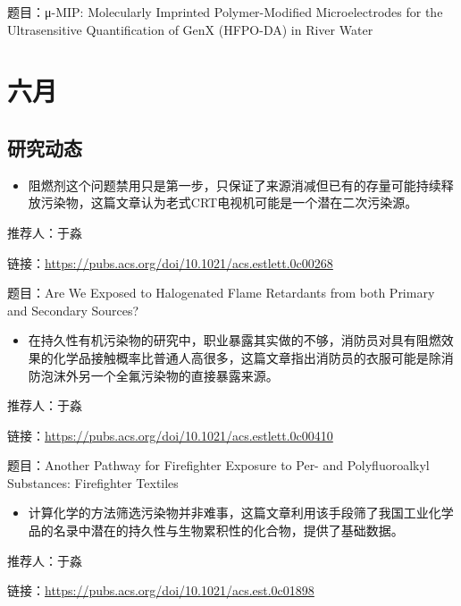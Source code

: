 \documentclass[]{book}
\providecommand{\tightlist}{%
  \setlength{\itemsep}{0pt}\setlength{\parskip}{0pt}}
\begin{document}
题目：μ-MIP: Molecularly Imprinted Polymer-Modified Microelectrodes for the Ultrasensitive Quantification of GenX (HFPO-DA) in River Water

\hypertarget{ux516dux6708-2}{%
\section*{六月}\label{ux516dux6708-2}}

\hypertarget{ux7814ux7a76ux52a8ux6001-31}{%
\subsection*{研究动态}\label{ux7814ux7a76ux52a8ux6001-31}}

\begin{itemize}
\tightlist
\item
  阻燃剂这个问题禁用只是第一步，只保证了来源消减但已有的存量可能持续释放污染物，这篇文章认为老式CRT电视机可能是一个潜在二次污染源。
\end{itemize}

推荐人：于淼

链接：\url{https://pubs.acs.org/doi/10.1021/acs.estlett.0c00268}

题目：Are We Exposed to Halogenated Flame Retardants from both Primary and Secondary Sources?

\begin{itemize}
\tightlist
\item
  在持久性有机污染物的研究中，职业暴露其实做的不够，消防员对具有阻燃效果的化学品接触概率比普通人高很多，这篇文章指出消防员的衣服可能是除消防泡沫外另一个全氟污染物的直接暴露来源。
\end{itemize}

推荐人：于淼

链接：\url{https://pubs.acs.org/doi/10.1021/acs.estlett.0c00410}

题目：Another Pathway for Firefighter Exposure to Per- and Polyfluoroalkyl Substances: Firefighter Textiles

\begin{itemize}
\tightlist
\item
  计算化学的方法筛选污染物并非难事，这篇文章利用该手段筛了我国工业化学品的名录中潜在的持久性与生物累积性的化合物，提供了基础数据。
\end{itemize}

推荐人：于淼

链接：\url{https://pubs.acs.org/doi/10.1021/acs.est.0c01898}
\end{document}

